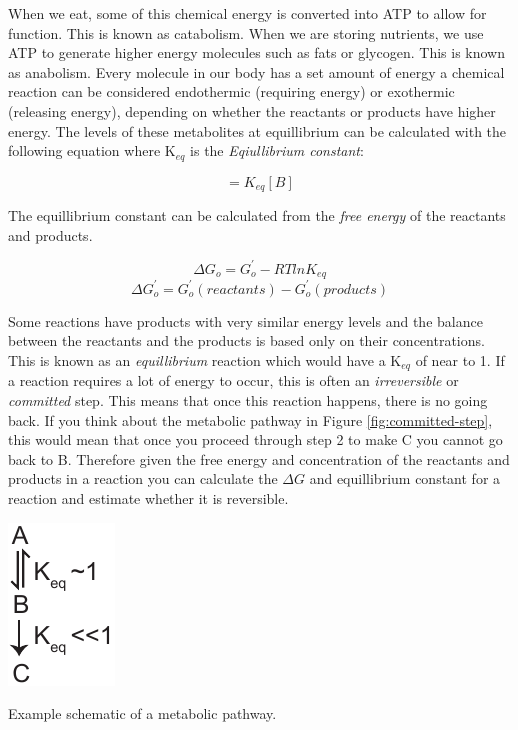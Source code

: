 \documentclass{tufte-handout}
\begin{document}
  When we eat, some of this chemical energy is converted into ATP to allow for function.  This is known as catabolism.  When we are storing nutrients, we use ATP to generate higher energy molecules such as fats or glycogen.  This is known as anabolism.  Every molecule in our body has a set amount of energy a chemical reaction can be considered endothermic (requiring energy) or exothermic (releasing energy), depending on whether the reactants or products have higher energy.  The levels of these metabolites at equillibrium can be calculated with the following equation where K$_{eq}$ is the \emph{Eqiullibrium constant}:

\begin{equation}
[A]=K_{eq}[B]
\end{equation}

 The equillibrium constant can be calculated from the \emph{free energy} of the reactants and products.

\begin{equation}
\Delta G_{o} = G^{'}_{o} - R T ln K_{eq}
\end{equation}
\begin{equation}
\Delta G^{'}_{o} = G^{'}_{o} (reactants) - G^{'}_{o} (products) 
 \end{equation}


Some reactions have products with very similar energy levels and the balance between the reactants and the products is based only on their concentrations.  This is known as an \emph{equillibrium} reaction which would have a K$_{eq}$ of near to 1.  If a reaction requires a lot of energy to occur, this is often an \emph{irreversible} or \emph{committed} step.  This means that once this reaction happens, there is no going back.  If you think about the metabolic pathway in Figure \ref{fig:committed-step}, this would mean that once you proceed through step 2 to make  C you cannot go back to B.  Therefore given the free energy and concentration of the reactants and products in a reaction you can calculate the $\Delta G$ and equillibrium constant for a reaction and estimate whether it is reversible.

\begin{marginfigure}
\includegraphics[width=0.5\marginparwidth]{figures/committed-step.pdf}\
\caption{Example schematic of a metabolic pathway.}
\label{fig:committed-step}
\end{marginfigure}
\end{document}
